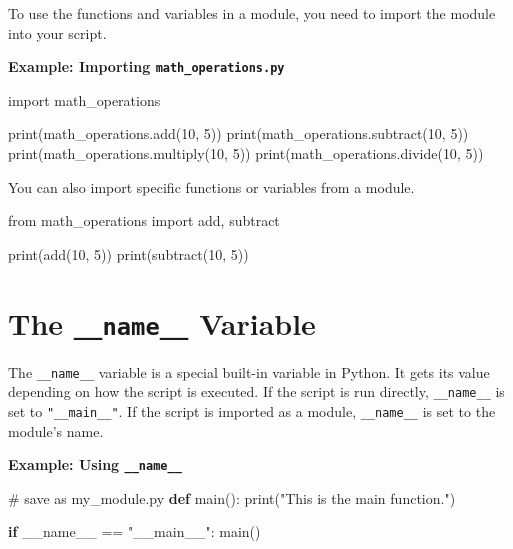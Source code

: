\documentclass[
  letterpaper,
  DIV=11,
  numbers=noendperiod]{scrreprt}
\newenvironment{Shaded}{\begin{snugshade}}{\end{snugshade}}
\newcommand{\BuiltInTok}[1]{\textcolor[rgb]{0.00,0.23,0.31}{#1}}
\newcommand{\CommentTok}[1]{\textcolor[rgb]{0.37,0.37,0.37}{#1}}
\newcommand{\ControlFlowTok}[1]{\textcolor[rgb]{0.00,0.23,0.31}{\textbf{#1}}}
\newcommand{\DecValTok}[1]{\textcolor[rgb]{0.68,0.00,0.00}{#1}}
\newcommand{\ImportTok}[1]{\textcolor[rgb]{0.00,0.46,0.62}{#1}}
\newcommand{\KeywordTok}[1]{\textcolor[rgb]{0.00,0.23,0.31}{\textbf{#1}}}
\newcommand{\NormalTok}[1]{\textcolor[rgb]{0.00,0.23,0.31}{#1}}
\newcommand{\OperatorTok}[1]{\textcolor[rgb]{0.37,0.37,0.37}{#1}}
\newcommand{\StringTok}[1]{\textcolor[rgb]{0.13,0.47,0.30}{#1}}
\newcommand{\VariableTok}[1]{\textcolor[rgb]{0.07,0.07,0.07}{#1}}
\begin{document}
To use the functions and variables in a module, you need to import the
module into your script.

\textbf{Example: Importing \texttt{math\_operations.py}}

\begin{Shaded}
\begin{Highlighting}[]
\ImportTok{import}\NormalTok{ math\_operations}

\BuiltInTok{print}\NormalTok{(math\_operations.add(}\DecValTok{10}\NormalTok{, }\DecValTok{5}\NormalTok{))}
\BuiltInTok{print}\NormalTok{(math\_operations.subtract(}\DecValTok{10}\NormalTok{, }\DecValTok{5}\NormalTok{))}
\BuiltInTok{print}\NormalTok{(math\_operations.multiply(}\DecValTok{10}\NormalTok{, }\DecValTok{5}\NormalTok{))}
\BuiltInTok{print}\NormalTok{(math\_operations.divide(}\DecValTok{10}\NormalTok{, }\DecValTok{5}\NormalTok{))}
\end{Highlighting}
\end{Shaded}

You can also import specific functions or variables from a module.

\begin{Shaded}
\begin{Highlighting}[]
\ImportTok{from}\NormalTok{ math\_operations }\ImportTok{import}\NormalTok{ add, subtract}

\BuiltInTok{print}\NormalTok{(add(}\DecValTok{10}\NormalTok{, }\DecValTok{5}\NormalTok{))}
\BuiltInTok{print}\NormalTok{(subtract(}\DecValTok{10}\NormalTok{, }\DecValTok{5}\NormalTok{))}
\end{Highlighting}
\end{Shaded}

\section{\texorpdfstring{The \texttt{\_\_name\_\_}
Variable}{The \_\_name\_\_ Variable}}\label{the-__name__-variable}

The \texttt{\_\_name\_\_} variable is a special built-in variable in
Python. It gets its value depending on how the script is executed. If
the script is run directly, \texttt{\_\_name\_\_} is set to
\texttt{"\_\_main\_\_"}. If the script is imported as a module,
\texttt{\_\_name\_\_} is set to the module's name.

\textbf{Example: Using \texttt{\_\_name\_\_}}

\begin{Shaded}
\begin{Highlighting}[]
\CommentTok{\# save as my\_module.py}
\KeywordTok{def}\NormalTok{ main():}
    \BuiltInTok{print}\NormalTok{(}\StringTok{"This is the main function."}\NormalTok{)}

\ControlFlowTok{if} \VariableTok{\_\_name\_\_} \OperatorTok{==} \StringTok{"\_\_main\_\_"}\NormalTok{:}
\NormalTok{    main()}
\end{Highlighting}
\end{Shaded}
\end{document}
